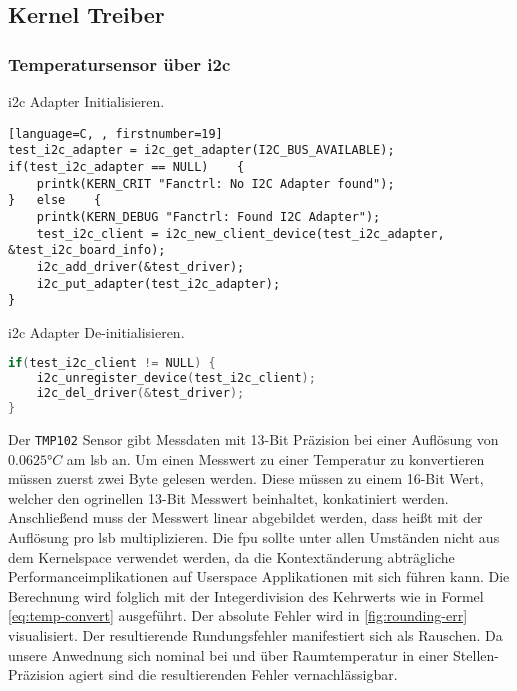 \subsection{Kernel Treiber}
\subsubsection{Temperatursensor über \acrshort{i2c}}

\Gls{i2c} Adapter Initialisieren.
\begin{lstlisting}[language=C, , firstnumber=19]
test_i2c_adapter = i2c_get_adapter(I2C_BUS_AVAILABLE);
if(test_i2c_adapter == NULL)	{
    printk(KERN_CRIT "Fanctrl: No I2C Adapter found");
}	else	{
    printk(KERN_DEBUG "Fanctrl: Found I2C Adapter");
    test_i2c_client = i2c_new_client_device(test_i2c_adapter, &test_i2c_board_info);
    i2c_add_driver(&test_driver);
    i2c_put_adapter(test_i2c_adapter);
}
\end{lstlisting}

\Gls{i2c} Adapter De-initialisieren.
\begin{lstlisting}[language=C, firstnumber=31]
if(test_i2c_client != NULL)	{
    i2c_unregister_device(test_i2c_client);
    i2c_del_driver(&test_driver);
}
\end{lstlisting}

Der \texttt{TMP102} Sensor gibt Messdaten mit 13-Bit Präzision bei einer Auflösung von $0.0625\si{\degree C}$ am \gls{lsb} an.
Um einen Messwert zu einer Temperatur zu konvertieren müssen zuerst zwei Byte gelesen werden.
Diese müssen zu einem 16-Bit Wert, welcher den ogrinellen 13-Bit Messwert beinhaltet, konkatiniert werden.
Anschlie{\ss}end muss der Messwert linear abgebildet werden, dass hei{\ss}t mit der Auflösung pro \gls{lsb} multiplizieren.
Die \gls{fpu} sollte unter allen Umständen nicht aus dem Kernelspace verwendet werden, 
da die Kontextänderung abträgliche Performanceimplikationen auf Userspace Applikationen mit sich führen kann.
Die Berechnung wird folglich mit der Integerdivision des Kehrwerts wie in Formel \autoref{eq:temp-convert} ausgeführt.
Der absolute Fehler wird in \autoref{fig:rounding-err} visualisiert.
Der resultierende Rundungsfehler manifestiert sich als Rauschen.
Da unsere Anwednung sich nominal bei und über Raumtemperatur in einer Stellen- Präzision agiert sind die resultierenden Fehler vernachlässigbar.

